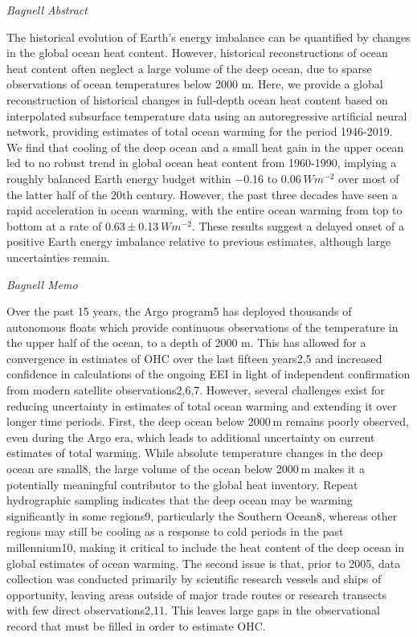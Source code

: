 \documentclass[
]{book}
\begin{document}
\emph{Bagnell Abstract}

The historical evolution of Earth's energy imbalance can be quantified by changes in the global ocean heat content. However, historical reconstructions of ocean heat content often neglect a large volume of the deep ocean, due to sparse observations of ocean temperatures below 2000 m. Here, we provide a global reconstruction of historical changes in full-depth ocean heat content based on interpolated subsurface temperature data using an autoregressive artificial neural network, providing estimates of total ocean warming for the period 1946-2019. We find that cooling of the deep ocean and a small heat gain in the upper ocean led to no robust trend in global ocean heat content from 1960-1990, implying a roughly balanced Earth energy budget within −0.16 to 0.06 \(Wm^{−2}\) over most of the latter half of the 20th century. However, the past three decades have seen a rapid acceleration in ocean warming, with the entire ocean warming from top to bottom at a rate of 0.63 ± 0.13 \(Wm^{−2}\). These results suggest a delayed onset of a positive Earth energy imbalance relative to previous estimates, although large uncertainties remain.

\emph{Bagnell Memo}

Over the past 15 years, the Argo program5 has deployed thousands of autonomous floats which provide continuous observations of the temperature in the upper half of the ocean, to a depth of 2000 m. This has allowed for a convergence in estimates of OHC over the last fifteen years2,5 and increased confidence in calculations of the ongoing EEI in light of independent confirmation from modern satellite observations2,6,7. However, several challenges exist for reducing uncertainty in estimates of total ocean warming and extending it over longer time periods. First, the deep ocean below 2000 m remains poorly observed, even during the Argo era, which leads to additional uncertainty on current estimates of total warming. While absolute temperature changes in the deep ocean are small8, the large volume of the ocean below 2000 m makes it a potentially meaningful contributor to the global heat inventory. Repeat hydrographic sampling indicates that the deep ocean may be warming significantly in some regions9, particularly the Southern Ocean8, whereas other regions may still be cooling as a response to cold periods in the past millennium10, making it critical to include the heat content of the deep ocean in global estimates of ocean warming. The second issue is that, prior to 2005, data collection was conducted primarily by scientific research vessels and ships of opportunity, leaving areas outside of major trade routes or research transects with few direct observations2,11. This leaves large gaps in the observational record that must be filled in order to estimate OHC.
\end{document}
